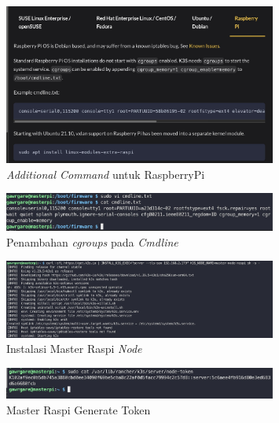 \begin{figure}[ht]
  \centering
  \includegraphics[width=0.8\textwidth]{resources/chapter-4/pengujian/raspi-02-additional.jpg}
  \caption{\textit{Additional Command} untuk RaspberryPi}
  \label{fig:additional-command-raspberrypi}
\end{figure}

\begin{figure}[ht]
  \centering
  \includegraphics[width=0.8\textwidth]{resources/chapter-4/pengujian/raspi-02-additional-02.jpg}
  \caption{Penambahan \textit{cgroups} pada \textit{Cmdline}}
  \label{fig:penambahan-cgroups-pada-cmdline}
\end{figure}

\begin{figure}[ht]
  \centering
  \includegraphics[width=0.8\textwidth]{resources/chapter-4/pengujian/raspi-03.jpg}
  \caption{Instalasi Master Raspi \textit{Node}}
  \label{fig:instalasi-master-raspi-nodes}
\end{figure}

\begin{figure}[ht]
  \centering
  \includegraphics[width=0.8\textwidth]{resources/chapter-4/pengujian/raspi-token-gen.jpg}
  \caption{Master Raspi Generate Token}
  \label{fig:raspi-master-gen-token}
\end{figure}


